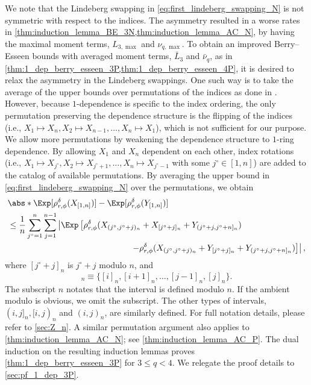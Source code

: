 \documentclass[aos]{imsart}
\begin{document}
We note that the Lindeberg swapping in \cref{eq:first_lindeberg_swapping_N} is not symmetric with respect to the indices. The asymmetry resulted in a worse rates in \cref{thm:induction_lemma_BE_3N,thm:induction_lemma_AC_N}, by having the maximal moment terms, $L_{3,\max}$ and $\nu_{q,\max}$. %
To obtain an improved Berry--Esseen bounds with averaged moment terms, $\bar{L}_3$ and $\bar{\nu}_q$, as in \cref{thm:1_dep_berry_esseen_3P,thm:1_dep_berry_esseen_4P}, it is desired to relax the asymmetry in the Lindeberg swappings. One such way is to take the average of the upper bounds over permutations of the indices as done in \citet{deng2020slightly,deng2020beyond}. However, because $1$-dependence is specific to the index ordering, the only permutation preserving the dependence structure is the flipping of the indices (i.e., $X_1 \mapsto X_n, X_2 \mapsto X_{n-1}, \dots, X_n \mapsto X_1$), which is not sufficient for our purpose. We allow more permutations by weakening the dependence structure to $1$-ring dependence. By allowing $X_1$ and $X_n$ dependent on each other, index rotations (i.e., $X_1 \mapsto X_{j^\circ}, X_2 \mapsto X_{j^\circ+1}, \dots, X_n \mapsto X_{j^\circ-1}$ with some $j^\circ \in [1,n]$) are added to the catalog of available permutations. By averaging the upper bound in \cref{eq:first_lindeberg_swapping_N} over the permutations, we obtain
\begin{equation} \label{eq:first_lindeberg_swapping_P}
\begin{aligned}
    & \abs*{ \Exp[\rho_{r,\phi}^\delta(X_{[1,n]})] - \Exp[\rho_{r,\phi}^\delta(Y_{[1,n]})]} \\
    & \leq \frac{1}{n} \sum_{j^\circ=1}^n \sum_{j=1}^{n-1} 
    \left| \Exp \left[
        \rho_{r,\phi}^\delta(X_{(j^\circ,j^\circ+j)_n} + X_{[j^\circ+j]_n} + Y_{(j^\circ+j,j^\circ+n]_n})
    \right. \right. \\
    & \hspace{2in} \left. \left.
        - \rho_{r,\phi}^\delta(X_{(j^\circ,j^\circ+j)_n} + Y_{[j^\circ+j]_n} + Y_{(j^\circ+j,j^\circ+n]_n})
    \right] \right|, \\
\end{aligned}
\end{equation}
where $[j^\circ+j]_n$ is $j^\circ+j$ modulo $n$, and
\begin{equation*}
    [i,j]_n \equiv \{[i]_n, [i+1]_n, \dots, [j-1]_n, [j]_n\}.
\end{equation*}
The subscript $n$ notates that the interval is defined modulo $n$. If the ambient modulo is obvious, we omit the subscript. The other types of intervals, $(i,j]_n, [i,j)_n$ and $(i,j)_n$, are similarly defined. For full notation details, please refer to \cref{sec:Z_n}. A similar permutation argument also applies to \cref{thm:induction_lemma_AC_N}; see \cref{thm:induction_lemma_AC_P}. The dual induction on the resulting induction lemmas proves \cref{thm:1_dep_berry_esseen_3P} for $3 \leq q < 4$. We relegate the proof details to \cref{sec:pf_1_dep_3P}.
\end{document}
